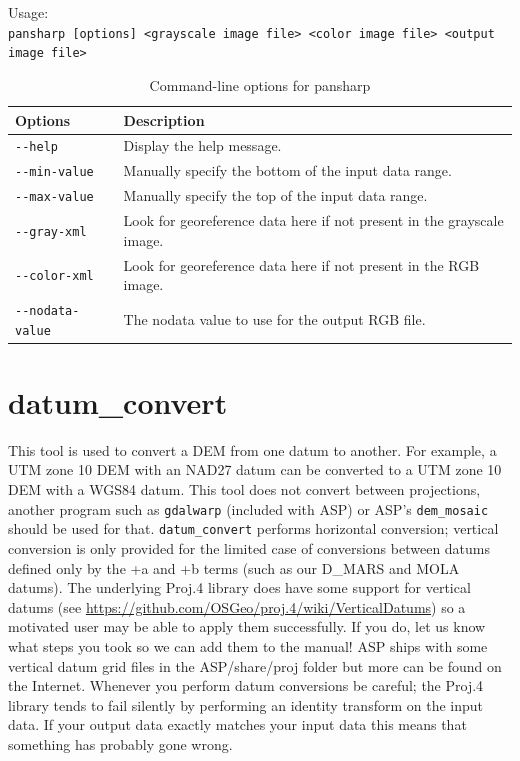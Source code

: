 \medskip

Usage:\\
\hspace*{2em}\texttt{pansharp [options] <grayscale image file> <color image file> <output image file>}

\medskip

\begin{longtable}{|l|p{10cm}|}
\caption{Command-line options for pansharp}
\label{tbl:pansharp}
\endfirsthead
\endhead
\endfoot
\endlastfoot
\hline
Options & Description \\ \hline \hline
\texttt{-\/-help} & Display the help message.\\ \hline
\texttt{-\/-min-value} & Manually specify the bottom of the input data range.\\ \hline
\texttt{-\/-max-value} & Manually specify the top of the input data range.\\ \hline
\texttt{-\/-gray-xml} & Look for georeference data here if not present in the grayscale image.\\ \hline
\texttt{-\/-color-xml} & Look for georeference data here if not present in the RGB image.\\ \hline
\texttt{-\/-nodata-value} & The nodata value to use for the output RGB file.\\ \hline
\end{longtable}

\section{datum\_convert}
\label{datumconvert}

This tool is used to convert a DEM from one datum to another.  For
example, a UTM zone 10 DEM with an NAD27 datum can be converted to a UTM
zone 10 DEM with a WGS84 datum.  This tool does not convert between
projections, another program such as \texttt{gdalwarp} (included with ASP) or
ASP's \texttt{dem\_mosaic} should be used for that. \texttt{datum\_convert} performs
horizontal conversion; vertical conversion is only provided for the limited case of 
conversions between datums defined only by the +a and +b terms (such as our 
D\_MARS and MOLA datums).  The underlying Proj.4 library does have some support for
vertical datums (see \url{https://github.com/OSGeo/proj.4/wiki/VerticalDatums}) so
a motivated user may be able to apply them successfully.  If you do, let us know what
steps you took so we can add them to the manual!  ASP ships with some vertical datum
grid files in the ASP/share/proj folder but more can be found on the Internet.  Whenever
you perform datum conversions be careful; the Proj.4 library tends to fail silently by
performing an identity transform on the input data.  If your output data exactly matches
your input data this means that something has probably gone wrong.

